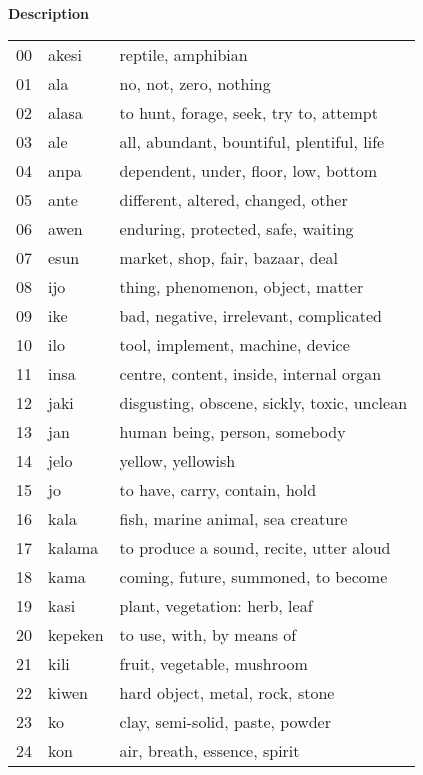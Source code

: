 \documentclass[11pt]{article}
\begin{document}
{\begin{center}
\textbf{Description}
\end{center}
\tiny
\begin{multicols}{2}[]
\begin{center}
\begin{tabularx}{\linewidth}{rlX}
00 & akesi & reptile, amphibian\\[0pt]
01 & ala & no, not, zero, nothing\\[0pt]
02 & alasa & to hunt, forage, seek, try to, attempt\\[0pt]
03 & ale & all, abundant, bountiful, plentiful, life\\[0pt]
04 & anpa & dependent, under, floor, low, bottom\\[0pt]
05 & ante & different, altered, changed, other\\[0pt]
06 & awen & enduring, protected, safe, waiting\\[0pt]
07 & esun & market, shop, fair, bazaar, deal\\[0pt]
08 & ijo & thing, phenomenon, object, matter\\[0pt]
09 & ike & bad, negative, irrelevant, complicated\\[0pt]
10 & ilo & tool, implement, machine, device\\[0pt]
11 & insa & centre, content, inside, internal organ\\[0pt]
12 & jaki & disgusting, obscene, sickly, toxic, unclean\\[0pt]
13 & jan & human being, person, somebody\\[0pt]
14 & jelo & yellow, yellowish\\[0pt]
15 & jo & to have, carry, contain, hold\\[0pt]
16 & kala & fish, marine animal, sea creature\\[0pt]
17 & kalama & to produce a sound, recite, utter aloud\\[0pt]
18 & kama & coming, future, summoned, to become\\[0pt]
19 & kasi & plant, vegetation: herb, leaf\\[0pt]
20 & kepeken & to use, with, by means of\\[0pt]
21 & kili & fruit, vegetable, mushroom\\[0pt]
22 & kiwen & hard object, metal, rock, stone\\[0pt]
23 & ko & clay, semi-solid, paste, powder\\[0pt]
24 & kon & air, breath, essence, spirit\\[0pt]

\end{tabularx}
\end{center}
\end{multicols}}
\end{document}
